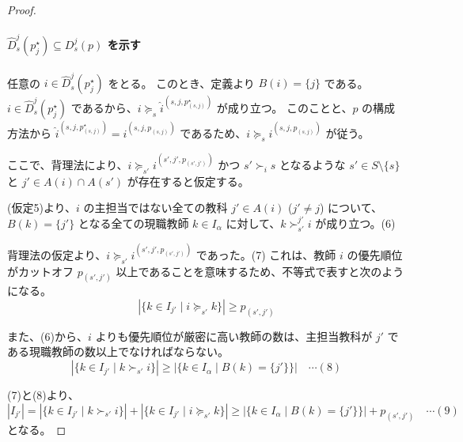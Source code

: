\documentclass[12pt, a4paper]{article}
\theoremstyle{definition}
\theoremstyle{remark}
\theoremstyle{plain}
\begin{document}
\begin{proof}
\paragraph{\(\widehat{D}_s^j(p^\star_j) \subseteq D_s^j(p)\) を示す}

任意の \(i \in \widehat{D}_s^j(p^\star_j)\) をとる。
このとき、定義より \(B(i) = \{j\}\) である。
\(i \in \widehat{D}_s^j(p^\star_j)\) であるから、$i \succeq_s \widehat{i}^{(s,j,p^\star_{(s,j)})}$ が成り立つ。
このことと、$p$ の構成方法から $\widehat{i}^{(s,j,p^\star_{(s,j)})} = i^{(s,j,p_{(s,j)})}$ であるため、$i \succeq_s i^{(s,j,p_{(s,j)})}$ が従う。

ここで、背理法により、$i \succeq_{s'} i^{(s',j',p_{(s',j')})}$ かつ $s' \succ_i s$ となるような $s' \in S\setminus \{s\}$ と $j' \in A(i) \cap A(s')$ が存在すると仮定する。

(仮定5)より、\(i\) の主担当ではない全ての教科 \(j' \in A(i)\) ($j' \neq j$) について、\(B(k) =\{j'\}\) となる全ての現職教師 \(k \in I_\alpha\) に対して、$k \succ_{s'}^{j'} i$ が成り立つ。(6)

背理法の仮定より、$i \succeq_{s'} i^{(s',j',p_{(s',j')})}$ であった。(7)
これは、教師 \(i\) の優先順位がカットオフ \(p_{(s',j')}\) 以上であることを意味するため、不等式で表すと次のようになる。
\[
 |\{k \in I_{j'} \mid i \succeq_{s'} k\}| \geq p_{(s',j')}
\]

また、(6)から、\(i\) よりも優先順位が厳密に高い教師の数は、主担当教科が \(j'\) である現職教師の数以上でなければならない。
\[
 |\{k \in I_{j'} \mid k \succ_{s'} i\}| \geq | \{k \in I_{\alpha} \mid B(k) = \{j'\}\} | \quad \cdots (8)
\]

(7)と(8)より、
\[
 |I_{j'}| = |\{k \in I_{j'} \mid k \succ_{s'} i\}| + |\{k \in I_{j'} \mid i \succeq_{s'} k\}| \geq | \{k \in I_{\alpha} \mid B(k) = \{j'\}\} | + p_{(s',j')} \quad \cdots (9)
\]
となる。





\end{proof}
\end{document}

